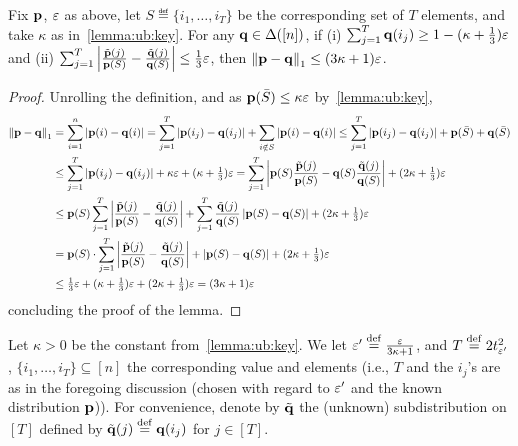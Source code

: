 \begin{lemma}\label{lemma:ub:easy}
  Fix $\mathbf{p}$, $\varepsilon$ as above, let $S\eqdef \{i_1,\dots, i_T\}$ be the corresponding set of $T$ elements, and take $\kappa$ as in~\cref{lemma:ub:key}. For any $\mathbf{q}\in\Delta\!\left([n]\right)$, if \textsf{(i)} $\sum_{j=1}^T \mathbf{q}(i_j) \geq 1-(\kappa+\tfrac{1}{3})\varepsilon$ and \textsf{(ii)} $\sum_{j=1}^T \left\lvert  \frac{\tilde{\mathbf{p}}(j)}{\mathbf{p}(S)} - \frac{\tilde{\mathbf{q}}(j)}{\mathbf{q}(S)}  \right\rvert \leq \tfrac{1}{3}\varepsilon$, then ${\lVert\mathbf{p}-\mathbf{q}{\rVert}}_1\leq (3\kappa+1)\varepsilon$.
\end{lemma}
\begin{proof}
Unrolling the definition, and as $\mathbf{p}( \bar{S} )\leq \kappa\varepsilon$ by~\cref{lemma:ub:key},
\begin{align*}
  {\lVert\ensuremath{\mathbf{p}}-\ensuremath{\mathbf{q}}{\rVert}}_1 &= \sum_{i=1}^n \left\lvert  \mathbf{p}(i)-\mathbf{q}(i)  \right\rvert
  = \sum_{j=1}^T \left\lvert  \mathbf{p}(i_j)-\mathbf{q}(i_j)  \right\rvert + \sum_{i\notin S} \left\lvert  \mathbf{p}(i)-\mathbf{q}(i)  \right\rvert
  \leq \sum_{j=1}^T \left\lvert  \mathbf{p}(i_j)-\mathbf{q}(i_j)  \right\rvert + \mathbf{p}( \bar{S} ) + \mathbf{q}( \bar{S} ) \\
  &\leq \sum_{j=1}^T \left\lvert  \mathbf{p}(i_j)-\mathbf{q}(i_j)  \right\rvert + \kappa\varepsilon + (\kappa+\tfrac{1}{3})\varepsilon
  = \sum_{j=1}^T \left\lvert  \mathbf{p}(S)\frac{\tilde{\mathbf{p}}(j)}{\mathbf{p}(S)}-\mathbf{q}(S)\frac{\tilde{\mathbf{q}}(j)}{\mathbf{q}(S)}  \right\rvert + (2\kappa+\tfrac{1}{3})\varepsilon \\
  &\leq \mathbf{p}(S)\sum_{j=1}^T \left\lvert  \frac{\tilde{\mathbf{p}}(j)}{\mathbf{p}(S)}-\frac{\tilde{\mathbf{q}}(j)}{\mathbf{q}(S)}  \right\rvert + \sum_{j=1}^T \frac{\tilde{\mathbf{q}}(j)}{\mathbf{q}(S)}\left\lvert   \mathbf{p}(S) - \mathbf{q}(S)  \right\rvert + (2\kappa+\tfrac{1}{3})\varepsilon\\
  &= \mathbf{p}(S)\cdot \sum_{j=1}^T \left\lvert  \frac{\tilde{\mathbf{p}}(j)}{\mathbf{p}(S)}-\frac{\tilde{\mathbf{q}}(j)}{\mathbf{q}(S)}  \right\rvert + \left\lvert   \mathbf{p}(S) - \mathbf{q}(S)  \right\rvert + (2\kappa+\tfrac{1}{3})\varepsilon \\
  &\leq \tfrac{1}{3}\varepsilon + (\kappa+\tfrac{1}{3})\varepsilon + (2\kappa+\tfrac{1}{3})\varepsilon = (3\kappa+1)\varepsilon
\end{align*}
concluding the proof of the lemma.
\end{proof}

  Let $\kappa>0$ be the constant from~\cref{lemma:ub:key}. We let $\varepsilon' \stackrel{\rm def}{=} \frac{\varepsilon}{3\kappa+1}$, and $T\stackrel{\rm def}{=} 2t^2_{\varepsilon'}$, $\{i_1,\dots,i_T\}\subseteq [n]$ the corresponding value and elements (i.e., $T$ and the $i_j$'s are as in the foregoing discussion (chosen with regard to $\varepsilon'$ and the known distribution $\mathbf{p}$)). For convenience, denote by $\tilde{\mathbf{q}}$ the (unknown) subdistribution on $[T]$ defined by $\tilde{\mathbf{q}}(j) \stackrel{\rm def}{=} \mathbf{q}(i_j)$ for $j\in[T]$.
  
